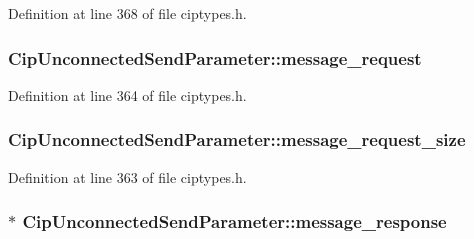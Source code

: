 \-Definition at line 368 of file ciptypes.\-h.

\hypertarget{structCipUnconnectedSendParameter_af5e4965a545d1c84217c325ab4d45a12}{
\subsubsection[{message\-\_\-request}]{ {\bf \-Cip\-Unconnected\-Send\-Parameter\-::message\-\_\-request}}}\label{de/dcb/structCipUnconnectedSendParameter_af5e4965a545d1c84217c325ab4d45a12}


\-Definition at line 364 of file ciptypes.\-h.

\hypertarget{structCipUnconnectedSendParameter_a187cc1e87799f979450a4379eccfcfc6}{
\subsubsection[{message\-\_\-request\-\_\-size}]{ {\bf \-Cip\-Unconnected\-Send\-Parameter\-::message\-\_\-request\-\_\-size}}}\label{de/dcb/structCipUnconnectedSendParameter_a187cc1e87799f979450a4379eccfcfc6}


\-Definition at line 363 of file ciptypes.\-h.

\hypertarget{structCipUnconnectedSendParameter_a88947b0ab51ed0696ac39709c405e313}{
\subsubsection[{message\-\_\-response}]{$\ast$ {\bf \-Cip\-Unconnected\-Send\-Parameter\-::message\-\_\-response}}}\label{de/dcb/structCipUnconnectedSendParameter_a88947b0ab51ed0696ac39709c405e313}


